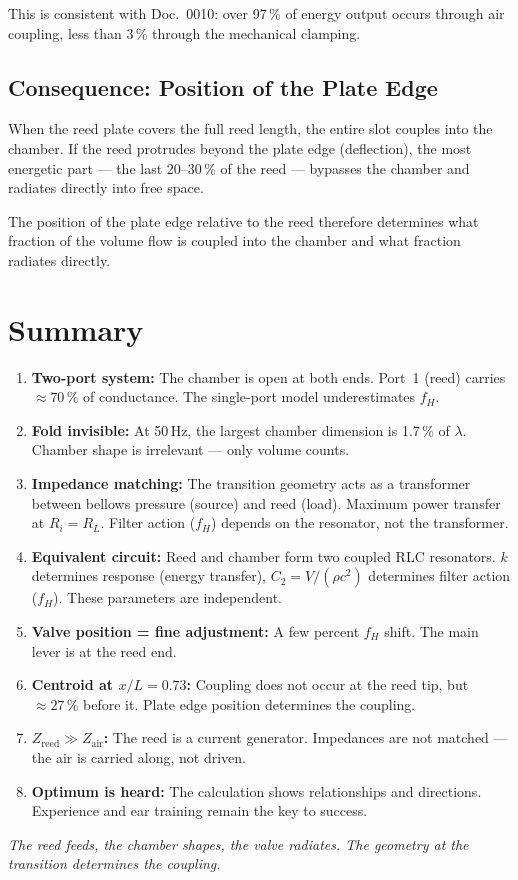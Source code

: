 \documentclass[11pt,a4paper]{article}
\begin{document}
This is consistent with Doc.~0010: over 97\,\% of energy output occurs through air coupling, less than 3\,\% through the mechanical clamping.

\subsection{Consequence: Position of the Plate Edge}

When the reed plate covers the full reed length, the entire slot couples into the chamber. If the reed protrudes beyond the plate edge (deflection), the most energetic part --- the last 20--30\,\% of the reed --- bypasses the chamber and radiates directly into free space.

The position of the plate edge relative to the reed therefore determines what fraction of the volume flow is coupled into the chamber and what fraction radiates directly.

\section{Summary}

\begin{enumerate}
\item \textbf{Two-port system:} The chamber is open at both ends. Port~1 (reed) carries $\approx 70\,\%$ of conductance. The single-port model underestimates $f_H$.
\item \textbf{Fold invisible:} At 50\,Hz, the largest chamber dimension is 1.7\,\% of $\lambda$. Chamber shape is irrelevant --- only volume counts.
\item \textbf{Impedance matching:} The transition geometry acts as a transformer between bellows pressure (source) and reed (load). Maximum power transfer at $R_i = R_L$. Filter action ($f_H$) depends on the resonator, not the transformer.
\item \textbf{Equivalent circuit:} Reed and chamber form two coupled RLC resonators. $k$ determines response (energy transfer), $C_2 = V/(\rho c^2)$ determines filter action ($f_H$). These parameters are independent.
\item \textbf{Valve position = fine adjustment:} A few percent $f_H$ shift. The main lever is at the reed end.
\item \textbf{Centroid at $x/L = 0{.}73$:} Coupling does not occur at the reed tip, but $\approx 27\,\%$ before it. Plate edge position determines the coupling.
\item \textbf{$Z_\mathrm{reed} \gg Z_\mathrm{air}$:} The reed is a current generator. Impedances are not matched --- the air is carried along, not driven.
\item \textbf{Optimum is heard:} The calculation shows relationships and directions. Experience and ear training remain the key to success.
\end{enumerate}

\bigskip
\textit{The reed feeds, the chamber shapes, the valve radiates. The geometry at the transition determines the coupling.}
\end{document}
